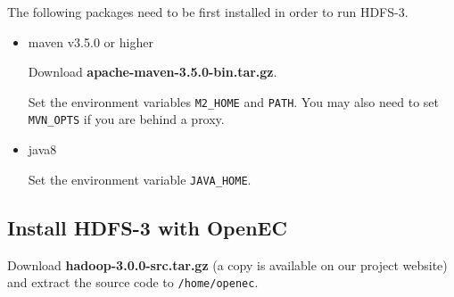 \documentclass[letterpaper,12pt]{article}
\begin{document}
The following packages need to be first installed in order to run HDFS-3.

\begin{itemize}

\item maven v3.5.0 or higher

Download {\bf apache-maven-3.5.0-bin.tar.gz}.

\begin{center}
\noindent{}
\end{center}

Set the environment variables {\tt M2\_HOME} and {\tt PATH}. You may also need
to set {\tt MVN\_OPTS} if you are behind a proxy.

\begin{center}
\noindent{}
\end{center}



\item java8

\begin{center}
\noindent{}
\end{center}

Set the environment variable {\tt JAVA\_HOME}.

\end{itemize}

\subsection{Install HDFS-3 with OpenEC}

Download {\bf hadoop-3.0.0-src.tar.gz} (a copy is available on our project
website) and extract the source code to {\tt /home/openec}. 

\begin{center}
\noindent{}
\end{center}
\end{document}

